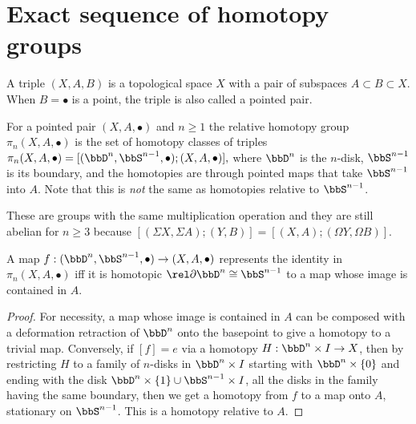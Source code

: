 \section{Exact sequence of homotopy groups}

\begin{defn}
    A triple $(X,A,B)$ is a topological space $X$ with a pair of subspaces $A\subset B\subset X$. When $B=\bullet$ is a point, the triple is also called a pointed pair.
\end{defn}

\begin{defn}
        For a pointed pair $(X,A,\bullet)$ and $n\geq 1$ the relative homotopy group $\pi_n(X,A,\bullet)$ is the set of homotopy classes of triples $\pi_n(X,A,\bullet)=[(\bbD^n,\bbS^{n-1},\bullet);(X,A,\bullet)],$
        where $\bbD^n$ is the $n$-disk, $\bbS^{n-1}$ is its boundary, and the homotopies are through pointed maps that take $\bbS^{n-1}$ into $A$. Note that this is \emph{not} the same as homotopies relative to $\bbS^{n-1}$.
\end{defn}
These are groups with the same multiplication operation and they are still abelian for $n\geq 3$ because $[(\Sigma X,\Sigma A);(Y,B)]=[( X, A);(\Omega Y,\Omega B)]$.
\begin{prop}\label{prop: compression criterion}
    A map $f:(\bbD^n,\bbS^{n-1},\bullet)\to (X,A,\bullet)$ represents the identity in $\pi_n(X,A,\bullet)$ iff it is homotopic $\rel \partial \bbD^n\cong \bbS^{n-1}$ to a map whose image is contained in $A$.
\end{prop}
\begin{proof}
    For necessity, a map whose image is contained in $A$ can be composed with a deformation retraction of $\bbD^n$ onto the basepoint to give a homotopy to a trivial map. Conversely, if $[f]=e$ via a homotopy $H:\bbD^n\times I\to X$, then by restricting $H$ to a family of $n$-disks in $\bbD^n\times I$ starting with $\bbD^n\times \{0\}$ and ending with the disk $\bbD^n\times\{1\}\cup \bbS^{n-1}\times I$, all the disks in the family having the same boundary, then we get a homotopy from $f$ to a map onto $A$, stationary on $\bbS^{n-1}$. This is a homotopy relative to $A$.
\end{proof}

